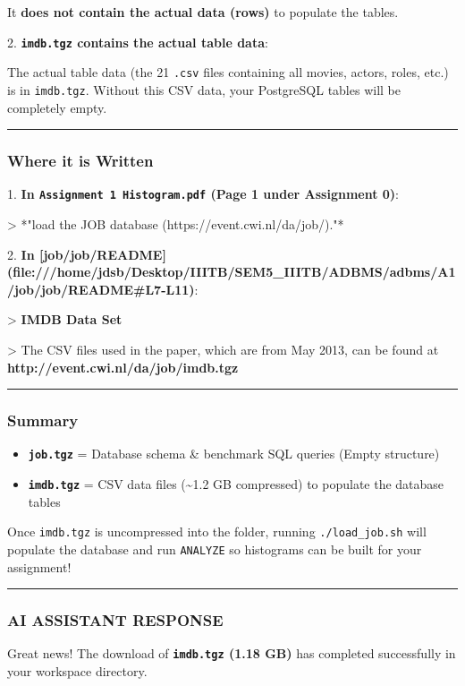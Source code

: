 \documentclass[11pt,a4paper]{article}
\begin{document}
It \textbf{does not contain the actual data (rows)} to populate the tables.


2. \textbf{\texttt{imdb.tgz} contains the actual table data}:

The actual table data (the 21 \texttt{.csv} files containing all movies, actors, roles, etc.) is in \texttt{imdb.tgz}. Without this CSV data, your PostgreSQL tables will be completely empty.


\hrule


\subsubsection{Where it is Written}

1. \textbf{In \texttt{Assignment 1 Histogram.pdf} (Page 1 under Assignment 0)}:

> *"load the JOB database (https://event.cwi.nl/da/job/)."*


2. \textbf{In [job/job/README](file:///home/jdsb/Desktop/IIITB/SEM5\_IIITB/ADBMS/adbms/A1/job/job/README\#L7-L11)}:

> \textbf{IMDB Data Set}

> The CSV files used in the paper, which are from May 2013, can be found at \textbf{http://event.cwi.nl/da/job/imdb.tgz}


\hrule


\subsubsection{Summary}
\begin{itemize}
\item \textbf{\texttt{job.tgz}} = Database schema \& benchmark SQL queries (Empty structure)
\item \textbf{\texttt{imdb.tgz}} = CSV data files (\textasciitilde{}1.2 GB compressed) to populate the database tables
\end{itemize}

Once \texttt{imdb.tgz} is uncompressed into the folder, running \texttt{./load\_job.sh} will populate the database and run \texttt{ANALYZE} so histograms can be built for your assignment!


\hrule

\subsubsection{AI ASSISTANT RESPONSE}

Great news! The download of \textbf{\texttt{imdb.tgz} (1.18 GB)} has completed successfully in your workspace directory.
\end{document}
